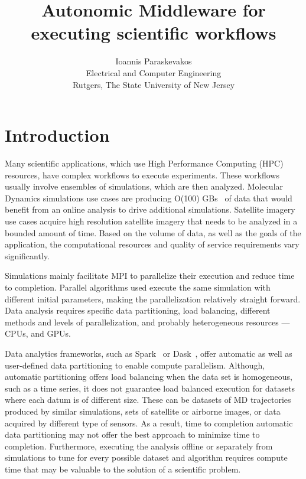 

\title{Autonomic Middleware for executing scientific workflows}
\author{Ioannis Paraskevakos \\	Electrical and Computer Engineering \\
        Rutgers, The State University of New Jersey}


\maketitle



\section{Introduction}
Many scientific applications, which use High Performance Computing (HPC) 
resources, have complex workflows to execute experiments. These workflows 
usually involve ensembles of simulations, which are then analyzed. Molecular 
Dynamics simulations use cases are producing O(100) GBs~\cite{cheatham2015impact} 
of data that would benefit from an online analysis to drive additional simulations. 
Satellite imagery use cases acquire high resolution satellite imagery that needs 
to be analyzed in a bounded amount of time. Based on the volume of data, as well 
as the goals of the application, the computational resources and quality of service 
requirements vary significantly. 


Simulations mainly facilitate MPI to parallelize their execution and reduce time 
to completion. Parallel algorithms used execute the same simulation with different 
initial parameters, making the parallelization relatively straight forward. Data 
analysis requires specific data partitioning, load balancing, different methods 
and levels of parallelization, and probably heterogeneous resources --- CPUs, 
and GPUs.

Data analytics frameworks, such as Spark~\cite{zaharia2010spark} or Dask~\cite{rocklin2015dask}, 
offer automatic as well as user-defined data partitioning to enable compute 
parallelism. Although, automatic partitioning offers load balancing when the 
data set is homogeneous, such as a time series, it does not guarantee load 
balanced execution for datasets where each datum is of different size. These 
can be datasets of MD trajectories produced by similar simulations, sets of 
satellite or airborne images, or data acquired by different type of sensors. As 
a result, time to completion automatic data partitioning may not offer the best 
approach to minimize time to completion. Furthermore, executing the analysis 
offline or separately from simulations to tune for every possible dataset and 
algorithm requires compute time that may be valuable to the solution of a 
scientific problem.

